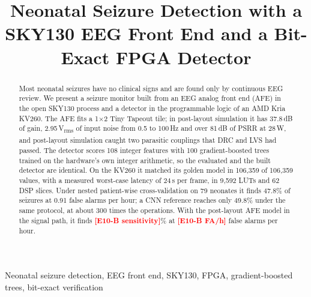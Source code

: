 \documentclass[conference]{IEEEtran}
\newcommand{\uVrms}{\,\textmu V\textsubscript{rms}}
\newcommand{\uW}{\,\textmu W}
\newcommand{\tbd}[1]{\textcolor{red}{\textbf{[#1]}}}
\newif\ifblind
\begin{document}

\title{Neonatal Seizure Detection with a SKY130 EEG Front End and a Bit-Exact FPGA Detector}

\ifblind
\author{\IEEEauthorblockN{Anonymous submission}
\IEEEauthorblockA{Author names and affiliations withheld for double-blind review}}
\else
\author{
}
\fi

\maketitle

\begin{abstract}
Most neonatal seizures have no clinical signs and are found only by continuous EEG review. We present a seizure monitor built from an EEG analog front end (AFE) in the open SKY130 process and a detector in the programmable logic of an AMD Kria KV260. The AFE fits a 1$\times$2 Tiny Tapeout tile; in post-layout simulation it has 37.8\,dB of gain, 2.95\uVrms{} of input noise from 0.5 to 100\,Hz and over 81\,dB of PSRR at 28\uW, and post-layout simulation caught two parasitic couplings that DRC and LVS had passed. The detector scores 108 integer features with 100 gradient-boosted trees trained on the hardware's own integer arithmetic, so the evaluated and the built detector are identical. On the KV260 it matched its golden model in 106,359 of 106,359 values, with a measured worst-case latency of 24\,\textmu s per frame, in 9,592 LUTs and 62 DSP slices. Under nested patient-wise cross-validation on 79 neonates it finds 47.8\% of seizures at 0.91 false alarms per hour; a CNN reference reaches only 49.8\% under the same protocol, at about 300 times the operations. With the post-layout AFE model in the signal path, it finds \tbd{E10-B sensitivity}\% at \tbd{E10-B FA/h} false alarms per hour.
\end{abstract}

\begin{IEEEkeywords}
Neonatal seizure detection, EEG front end, SKY130, FPGA, gradient-boosted trees, bit-exact verification
\end{IEEEkeywords}
\end{document}

